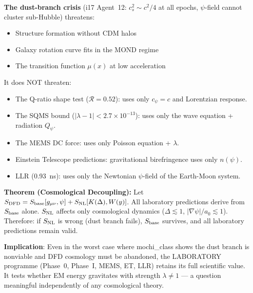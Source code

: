 \documentclass[11pt]{article}
\newcommand{\ee}[1]{\times 10^{#1}}
\newcommand{\Qpsi}{Q_\psi}
\newcommand{\lbone}{|\lambda - 1|}
\theoremstyle{definition}
\theoremstyle{remark}
\begin{document}
\begin{tcolorbox}[colback=blue!5!white, colframe=blue!60!black,
  title=\textbf{W4i18 P2: SQMS BOUND REASSESSMENT --- 5 KEY RESULTS}]
\begin{enumerate}
  \textbf{The dust-branch crisis} (i17 Agent~12: $c_s^2 \sim c^2/4$
  at all epochs, $\psi$-field cannot cluster sub-Hubble) threatens:
  \begin{itemize}[nosep]
  \item Structure formation without CDM halos
  \item Galaxy rotation curve fits in the MOND regime
  \item The transition function $\mu(x)$ at low acceleration
  \end{itemize}

  It does NOT threaten:
  \begin{itemize}[nosep]
  \item The Q-ratio shape test ($\mathcal{R} = 0.52$): uses only
    $c_\psi = c$ and Lorentzian response.
  \item The SQMS bound ($\lbone < 2.7\ee{-13}$): uses only the
    wave equation + radiation $\Qpsi$.
  \item The MEMS DC force: uses only Poisson equation + $\lambda$.
  \item Einstein Telescope predictions: gravitational birefringence
    uses only $n(\psi)$.
  \item LLR (0.93~ns): uses only the Newtonian $\psi$-field of
    the Earth-Moon system.
  \end{itemize}

  \textbf{Theorem (Cosmological Decoupling):} Let $S_{\rm DFD} =
  S_{\rm base}[g_{\mu\nu}, \psi] + S_{\rm NL}[K(\Delta), W(y)]$.
  All laboratory predictions derive from $S_{\rm base}$ alone.
  $S_{\rm NL}$ affects only cosmological dynamics ($\Delta \lesssim 1$,
  $|\nabla\psi|/a_0 \lesssim 1$). Therefore: if $S_{\rm NL}$ is
  wrong (dust branch fails), $S_{\rm base}$ survives, and all
  laboratory predictions remain valid.

  \textbf{Implication}: Even in the worst case where mochi\_class
  shows the dust branch is nonviable and DFD cosmology must be
  abandoned, the LABORATORY programme (Phase~0, Phase~I, MEMS,
  ET, LLR) retains its full scientific value. It tests whether
  EM energy gravitates with strength $\lambda \neq 1$ --- a
  question meaningful independently of any cosmological theory.

\end{enumerate}

\end{tcolorbox}


\end{document}
